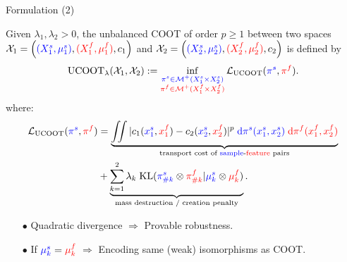 \documentclass{beamer}
\newcommand{\ucoot}{\text{UCOOT}}
\newcommand{\cX}{\mathcal X}
\newcommand{\cM}{\mathcal M}
\newcommand{\cL}{\mathcal L}
\newcommand{\pis}{{\color{blue}{\pi^s}}}
\newcommand{\pif}{{\color{red}{\pi^f}}}
\newcommand{\sfspace}{{\color{blue}{s.}}{\color{red}{f. }}}
\begin{document}
\begin{frame}{Formulation (2)}
\scriptsize
\vspace{-0.8cm}
\begin{definition}[UCOOT]
  Given $\lambda_1, \lambda_2 >0$, the unbalanced COOT of order $p \geq 1$
  between two \sfspace spaces $\cX_1 = \left({\color{blue}{(X_1^s, \mu_1^s)}}, {\color{red}{(X_1^f, \mu_1^f)}}, c_1 \right)$
  and $\cX_2 = \left({\color{blue}{(X_2^s, \mu_2^s)}}, {\color{red}{(X_2^f, \mu_2^f)}}, c_2 \right)$ is defined by
  \begin{align*}
\label{eq:ucoot}
    \ucoot_{\lambda}(\cX_1, \cX_2) :=
  \inf_{\substack{{\color{blue}{\pi^s \in \cM^+(X_1^s \times X_2^s)}}
  \\ {\color{red}{\pi^f \in \cM^+(X_1^f \times X_2^f)}}}}
  \cL_{\ucoot}(\pis, \pif).
\end{align*}
\vspace{-0.8cm}
where:
\begin{align*}
    \cL_{\ucoot}(\pis, \pif) &= \underbrace{\iint
    |c_1({\color{blue}{x_1^s}}, {\color{red}{x_1^f}}) - c_2({\color{blue}{x_2^s}}, {\color{red}{x_2^f}})|^p \; {\color{blue}{\mathrm d\pi^s(x_1^s, x_2^s)}} \;
    {\color{red}{\mathrm d \pi^f(x_1^f, x_2^f)}}}_{\text{transport cost of {\color{blue}{sample}}-{\color{red}{feature}} pairs}} \\
    &+ \underbrace{\sum_{k=1}^2\lambda_k \; \text{KL}({\color{blue}{\pi^s_{\# k}}} \otimes {\color{red}{\pi^f_{\# k}}} \vert {\color{blue}{\mu^s_k}} \otimes {\color{red}{\mu^f_k}})}_{\text{mass destruction / creation penalty}}.
\end{align*}
\end{definition}

\begin{itemize}
  \item[$\bullet$] Quadratic divergence $\Rightarrow$ Provable robustness.
  \item[$\bullet$] If ${\color{blue}{\mu^s_k}} = {\color{red}{\mu^f_k}}$ $\Rightarrow$
  Encoding same (weak) isomorphisms as COOT.
\end{itemize}



\end{frame}
\end{document}
